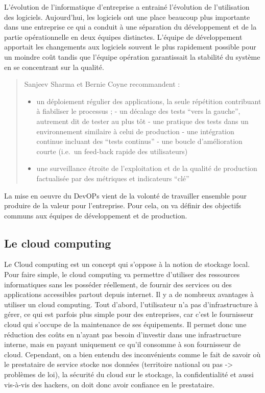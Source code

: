 \documentclass[]{article}
\begin{document}
L'évolution de l'informatique d'entreprise a entrainé l'évolution de
l'utilisation des logiciels. Aujourd'hui, les logiciels ont une place
beaucoup plus importante dans une entreprise ce qui a conduit à une
séparation du développement et de la partie opérationnelle en deux
équipes distinctes. L'équipe de développement apportait les changements
aux logiciels souvent le plus rapidement possible pour un moindre coût
tandis que l'équipe opération garantissait la stabilité du système en se
concentrant sur la qualité.

\begin{quote}
Sanjeev Sharma et Bernie Coyne recommandent : 
\begin{itemize}
\item un déploiement régulier
des applications, la seule répétition contribuant à fiabiliser le
processus ; - un décalage des tests ``vers la gauche'', autrement dit de
tester au plus tôt - une pratique des tests dans un environnement
similaire à celui de production - une intégration continue incluant des
``tests continus'' - une boucle d'amélioration courte (i.e.~un feed-back
rapide des utilisateurs) 
\item une surveillance étroite de l'exploitation et
de la qualité de production factualisée par des métriques et indicateurs
``clé''
\end{itemize}
\end{quote}

La mise en oeuvre du DevOPs vient de la volonté de travailler ensemble
pour produire de la valeur pour l'entreprise. Pour cela, on va définir
des objectifs communs aux équipes de développement et de production.

\subsection{Le cloud computing}\label{le-cloud-computing}

Le Cloud computing est un concept qui s'oppose à la notion de stockage
local. Pour faire simple, le cloud computing va permettre d'utiliser des
ressources informatiques sans les posséder réellement, de fournir des
services ou des applications accessibles partout depuis internet. Il y a
de nombreux avantages à utiliser un cloud computing. Tout d'abord,
l'utilisateur n'a pas d'infrastructure à gérer, ce qui est parfois plus
simple pour des entreprises, car c'est le fournisseur cloud qui s'occupe
de la maintenance de ses équipements. Il permet donc une réduction des
coûts en n'ayant pas besoin d'investir dans une infrastructure interne,
mais en payant uniquement ce qu'il consomme à son fournisseur de cloud.
Cependant, on a bien entendu des inconvénients comme le fait de savoir
où le prestataire de service stocke nos données (territoire national ou
pas -\textgreater{} problèmes de loi), la sécurité du cloud sur le
stockage, la confidentialité et aussi vis-à-vis des hackers, on doit
donc avoir confiance en le prestataire.
\end{document}
